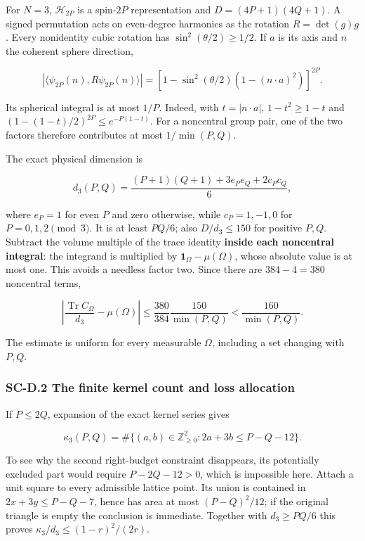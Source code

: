 \documentclass[a4paper,11pt]{article}
\numberwithin{equation}{section}
\begin{document}
For \(N=3\), \(\mathcal H_{2P}\) is a spin-\(2P\) representation and \(D=(4P+1)(4Q+1)\). A signed permutation acts on even-degree harmonics as the rotation \(R=\det(g)g\). Every nonidentity cubic rotation has \(\sin^2(\theta/2)\geq1/2\). If \(a\) is its axis and \(n\) the coherent sphere direction,

\[
|\langle\psi_{2P}(n),R\psi_{2P}(n)\rangle|
=\left[1-\sin^2(\theta/2)(1-(n\cdot a)^2)\right]^{2P}.
\]

Its spherical integral is at most \(1/P\). Indeed, with \(t=|n\cdot a|\), \(1-t^2\geq1-t\) and \((1-(1-t)/2)^{2P}\leq e^{-P(1-t)}\). For a noncentral group pair, one of the two factors therefore contributes at most \(1/\min(P,Q)\).

The exact physical dimension is

\[
d_3(P,Q)=\frac{(P+1)(Q+1)+3e_Pe_Q+2c_Pc_Q}{6},
\]

where \(e_P=1\) for even \(P\) and zero otherwise, while \(c_P=1,-1,0\) for \(P=0,1,2\pmod3\). It is at least \(PQ/6\); also \(D/d_3\leq150\) for positive \(P,Q\). Subtract the volume multiple of the trace identity \textbf{inside each noncentral integral}: the integrand is multiplied by \(\mathbf1_\Omega-\mu(\Omega)\), whose absolute value is at most one. This avoids a needless factor two. Since there are \(384-4=380\) noncentral terms,

\[
\left|\frac{\operatorname{Tr}C_\Omega}{d_3}-\mu(\Omega)\right|
\leq\frac{380}{384}\frac{150}{\min(P,Q)}
<\frac{160}{\min(P,Q)}.
\]

The estimate is uniform for every measurable \(\Omega\), including a set changing with \(P,Q\).

\hypertarget{sc-d.2-the-finite-kernel-count-and-loss-allocation}{%
\subsubsection{SC-D.2 The finite kernel count and loss allocation}\label{sc-d.2-the-finite-kernel-count-and-loss-allocation}}

If \(P\leq2Q\), expansion of the exact kernel series gives

\[
\kappa_3(P,Q)=\#\{(a,b)\in\mathbb Z_{\geq0}^2:
2a+3b\leq P-Q-12\}.
\]

To see why the second right-budget constraint disappears, its potentially excluded part would require \(P-2Q-12>0\), which is impossible here. Attach a unit square to every admissible lattice point. Its union is contained in \(2x+3y\leq P-Q-7\), hence has area at most \((P-Q)^2/12\); if the original triangle is empty the conclusion is immediate. Together with \(d_3\geq PQ/6\) this proves \(\kappa_3/d_3\leq(1-r)^2/(2r)\).
\end{document}

